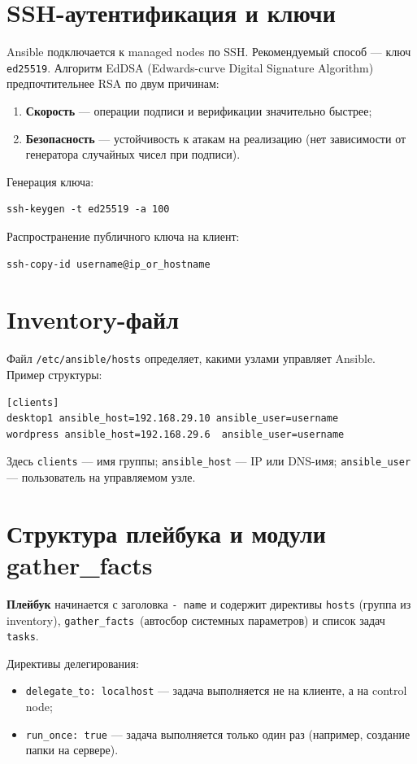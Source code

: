\section{SSH-аутентификация и ключи}

Ansible подключается к managed nodes по SSH. Рекомендуемый способ — ключ
\texttt{ed25519}. Алгоритм EdDSA (Edwards-curve Digital Signature Algorithm)
предпочтительнее RSA по двум причинам:
\begin{enumerate}
  \item \textbf{Скорость} — операции подписи и верификации значительно быстрее;
  \item \textbf{Безопасность} — устойчивость к атакам на реализацию
        (нет зависимости от генератора случайных чисел при подписи).
\end{enumerate}

Генерация ключа:
\begin{lstlisting}
ssh-keygen -t ed25519 -a 100
\end{lstlisting}

Распространение публичного ключа на клиент:
\begin{lstlisting}
ssh-copy-id username@ip_or_hostname
\end{lstlisting}

\section{Inventory-файл}

Файл \texttt{/etc/ansible/hosts} определяет, какими узлами управляет Ansible.
Пример структуры:
\begin{lstlisting}
[clients]
desktop1 ansible_host=192.168.29.10 ansible_user=username
wordpress ansible_host=192.168.29.6  ansible_user=username
\end{lstlisting}

Здесь \texttt{clients} — имя группы; \texttt{ansible\_host} — IP или
DNS-имя; \texttt{ansible\_user} — пользователь на управляемом узле.

\section{Структура плейбука и модули gather\_facts}

\textbf{Плейбук} начинается с заголовка \texttt{-~name} и содержит директивы
\texttt{hosts} (группа из inventory), \texttt{gather\_facts}~(автосбор
системных параметров) и список задач \texttt{tasks}.

Директивы делегирования:
\begin{itemize}
  \item \texttt{delegate\_to: localhost} — задача выполняется
        не на клиенте, а на control node;
  \item \texttt{run\_once: true} — задача выполняется только один раз
        (например, создание папки на сервере).
\end{itemize}

